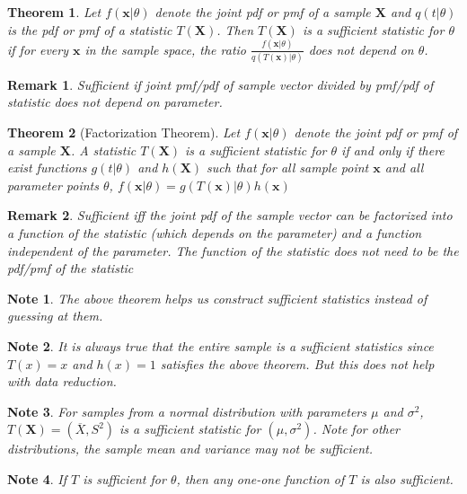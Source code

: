 \documentclass[14pt,twoside]{extreport}
\theoremstyle{dotless}
\newtheorem*{thm}{\footnotesize Theorem} %
\newtheorem*{note}{\footnotesize Note} %
\newtheorem*{remark}{\footnotesize Remark} %
\begin{document}
\begin{thm}
    Let $f(\bm{x}|\theta)$ denote the joint pdf or pmf of a sample $\bm{X}$ and $q(t|\theta)$ is the pdf or pmf of a statistic $T(\bm{X})$. 
    Then $T(\bm{X})$ is a sufficient statistic for $\theta$ if for every $\bm{x}$ in the sample space, the ratio $\frac{f(\bm{x}|\theta)}{q(T(\bm{x})|\theta)}$ does not depend on $\theta$.
\end{thm}

\begin{remark}
    Sufficient if joint pmf/pdf of sample vector divided by pmf/pdf of statistic does not depend on parameter.
\end{remark}

\begin{thm}[Factorization Theorem]
    Let $f(\bm{x}|\theta)$ denote the joint pdf or pmf of a sample $\bm{X}$. A statistic $T(\bm{X})$ is a sufficient statistic for $\theta$ if and only if there exist functions $g(t|\theta)$ and $h(\bm{X})$ such that for all sample point $\bm{x}$ and all parameter points $\theta$, $f(\bm{x}|\theta) = g(T(\bm{x})|\theta) h(\bm{x})$
\end{thm}

\begin{remark}
    Sufficient iff the joint pdf of the sample vector can be factorized into a function of the statistic (which depends on the parameter) and a function independent of the parameter. The function of the statistic does not need to be the pdf/pmf of the statistic
\end{remark}

\begin{note}
    The above theorem helps us construct sufficient statistics instead of guessing at them.
\end{note}

\begin{note}
    It is always true that the entire sample is a sufficient statistics since $T(x)=x$ and $h(x) = 1$ satisfies the above theorem. But this does not help with data reduction.
\end{note}

\begin{note}
    For samples from a normal distribution with parameters $\mu$ and $\sigma^2$, $T(\bm{X}) = (\overline{X}, S^2)$ is a sufficient statistic for $(\mu, \sigma^2)$.
Note for other distributions, the sample mean and variance may not be sufficient.
\end{note}

\begin{note}
    If $T$ is sufficient for $\theta$, then any one-one function of $T$ is also sufficient.
\end{note}
\end{document}
